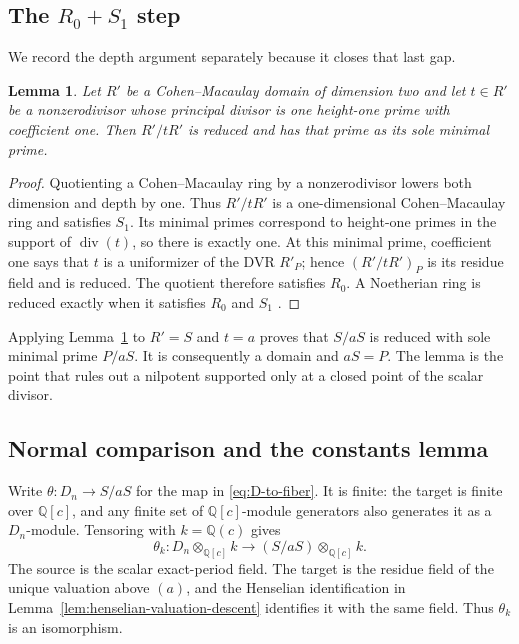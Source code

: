 \documentclass[11pt]{article}
\newtheorem{lemma}[theorem]{Lemma}
\theoremstyle{definition}
\theoremstyle{remark}
\newcommand{\Q}{\mathbb{Q}}
\newcommand{\divisor}{\operatorname{div}}
\begin{document}
\subsection{The $R_0+S_1$ step}

We record the depth argument separately because it closes that last gap.

\begin{lemma}\label{lem:R0S1}
Let $R'$ be a Cohen--Macaulay domain of dimension two and let $t\in R'$ be
a nonzerodivisor whose principal divisor is one height-one prime with
coefficient one.  Then $R'/tR'$ is reduced and has that prime as its sole
minimal prime.
\end{lemma}

\begin{proof}
Quotienting a Cohen--Macaulay ring by a nonzerodivisor lowers both dimension
and depth by one.  Thus $R'/tR'$ is a one-dimensional Cohen--Macaulay ring
and satisfies $S_1$.  Its minimal primes correspond to height-one primes in
the support of $\divisor(t)$, so there is exactly one.  At this minimal
prime, coefficient one says that $t$ is a uniformizer of the DVR
$R'_P$; hence $(R'/tR')_P$ is its residue field and is reduced.  The quotient
therefore satisfies $R_0$.  A Noetherian ring is reduced exactly when it
satisfies $R_0$ and $S_1$ \citep{stacks-033p}.
\end{proof}

Applying Lemma~\ref{lem:R0S1} to $R'=S$ and $t=a$ proves that $S/aS$ is
reduced with sole minimal prime $P/aS$.  It is consequently a domain and
$aS=P$.  The lemma is the point that rules out a nilpotent supported only at
a closed point of the scalar divisor.

\subsection{Normal comparison and the constants lemma}

Write $\theta:D_n\to S/aS$ for the map in \eqref{eq:D-to-fiber}.  It is
finite: the target is finite over $\Q[c]$, and any finite set of
$\Q[c]$-module generators also generates it as a $D_n$-module.  Tensoring
with $k=\Q(c)$ gives
\[
 \theta_k:
 D_n\otimes_{\Q[c]}k
 \longrightarrow
 (S/aS)\otimes_{\Q[c]}k.
\]
The source is the scalar exact-period field.  The target is the residue
field of the unique valuation above $(a)$, and the Henselian identification
in Lemma~\ref{lem:henselian-valuation-descent} identifies it with the same
field.  Thus $\theta_k$ is an isomorphism.
\end{document}
